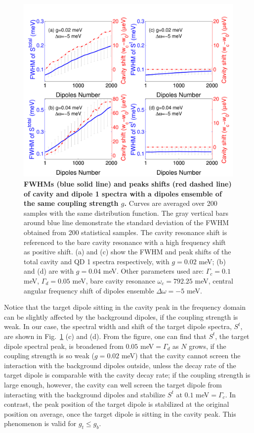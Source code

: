 \begin{figure}[htp]%
\centering
\begin{center}
\includegraphics[width=12cm]{./Figs/fwhm_wdrand5s20_E0dot2-0dot4_qd2000_stat200}
\end{center}
\caption[Spectral modification by pure background dipoles.]{\textbf{  FWHMs (blue solid line) and peaks shifts (red dashed line) of cavity and dipole 1 spectra with a dipoles ensemble of the same coupling strength $g$.} Curves are averaged over 200 samples with the same distribution function. The gray vertical bars around blue line demonstrate the standard deviation of the FWHM obtained from 200 statistical samples. The cavity resonance shift is referenced to the bare cavity resonance with a high frequency shift as positive shift. (a) and (c) show the FWHM and peak shifts of the total cavity and QD 1 spectra respectively, with $g=0.02$ meV; (b) and (d) are with $g=0.04$ meV. Other parameters used are: $\Gamma_c=0.1$ meV, $\Gamma_d=0.05$ meV, bare cavity resonance $\omega_c=792.25$ meV, central angular frequency shift of dipoles ensemble $\Delta\omega=-5$ meV. }
\label{fwhm_wdrand5s20_E0.2-0.4_qd2000_stat200}
\end{figure}

Notice that the target dipole sitting in the cavity peak in the frequency domain can be slightly affected by the background dipoles, if the coupling strength is weak. In our case, the spectral width and shift of the target dipole spectra, $S^t$, are shown in Fig.~\ref{fwhm_wdrand5s20_E0.2-0.4_qd2000_stat200} (c) and (d). From the figure, one can find that $S^t$, the target dipole spectral peak, is broadened from $0.05$ meV$=\Gamma_d$ as $N$ grows, if the coupling strength is so weak ($g=0.02$ meV) that the cavity cannot screen the interaction with the background dipoles outside, unless the decay rate of the target dipole is comparable with the cavity decay rate; if the coupling strength is large enough, however, the cavity can well screen the target dipole from interacting with the background dipoles and stabilize $S^t$ at $0.1$ meV$=\Gamma_c$. In contrast, the peak position of the target dipole is stabilized at the original position on average, once the target dipole is sitting in the cavity peak. This phenomenon is valid for $g_t\leq g_b$.

